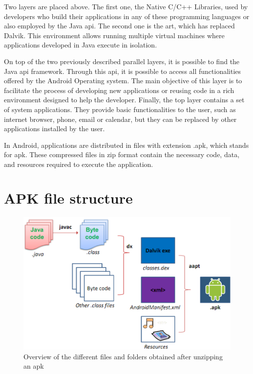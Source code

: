 Two layers are placed above. The first one, the Native C/C++ Libraries, used by developers who build their applications in any of these programming languages or also employed by
the Java \ac{api}. The second one is the \ac{art}, which has replaced Dalvik.
This environment allows running multiple virtual machines where applications developed in Java
execute in isolation.

On top of the two previously described parallel layers, it is possible to find the Java \ac{api}
framework. Through this \ac{api}, it is possible to access all functionalities offered by the Android
Operating system. The main objective of this layer is to facilitate the process of developing new
applications or reusing code in a rich environment designed to help the developer. Finally, the
top layer contains a set of system applications. They provide basic functionalities to the user,
such as internet browser, phone, email or calendar, but they can be replaced by other applications
installed by the user.

In Android, applications are distributed in files with extension .apk, which stands for \ac{apk}. These compressed files in zip format contain the necessary code, data, and
resources required to execute the application. 

\section{APK file structure}

\begin{figure}[htbp]
  \centering
  \includegraphics[scale=0.6]{./Figure/apkfile.png}
  \caption{Overview of the different files and folders obtained after unzipping an \ac{apk}}
  \label{fig:apk}
\end{figure}

